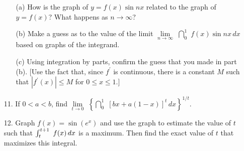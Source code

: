\documentclass{sebase}
\begin{document}
\begin{enumerate}
\begin{enumerate}
\item[(a)] How is the graph of $y=f(x)\sin nx$ related to the graph of $%
y=f(x)$? What happens as $n\rightarrow \infty $?

%

\item[(b)] Make a guess as to the value of the limit $\lim\limits_{n%
\rightarrow \infty }\,\,\dint\nolimits_{0}^{1}\,\,f(x)\sin nx\,dx$ based on
graphs of the integrand.

%

\item[(c)] Using integration by parts, confirm the guess that you made in
part (b). [Use the fact that, since $f^{\prime }$ is continuous, there is a
constant $M$ such that $\left\vert f^{\prime }(x)\right\vert \leq M$ for $%
0\leq x\leq 1$.]

%
\end{enumerate}

\item[11.] If $0<a<b$, find $\lim\limits_{t\rightarrow 0}\,\,\left\{
\dint\nolimits_{0}^{1}\,\,[bx+a(1-x)]^{t}\,dx\right\} ^{1/t}$.

%

%

\item[12.] 
\GCALCXpp%
Graph $f(x)=\sin (e^{x})$ and use the graph to estimate the value of $t$
such that $\textstyle \int\nolimits_{t}^{t+1}\,\,f(x)\,dx$ is a maximum. Then find the
exact value of $t$ that maximizes this integral.


\end{enumerate}
\end{document}
